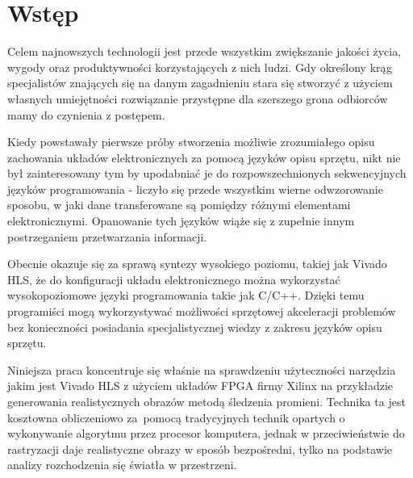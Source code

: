 
\chapter*{Wstęp}
{

\pagestyle{empty}
\pagestyle{fancy}
\fancyhead{} %
\fancyhead[RO,LE]{\thepage}

Celem najnowszych technologii jest przede wszystkim zwiększanie jakości życia, wygody oraz produktywności korzystających z nich ludzi. Gdy określony krąg specjalistów znających się na danym zagadnieniu stara się stworzyć z użyciem własnych umiejętności rozwiązanie przystępne dla szerszego grona odbiorców mamy do czynienia z postępem.

Kiedy powstawały pierwsze próby stworzenia możliwie zrozumiałego opisu zachowania układów elektronicznych za pomocą języków opisu sprzętu, nikt nie był zainteresowany tym by upodabniać je do rozpowszechnionych sekwencyjnych języków programowania - liczyło się przede wszystkim wierne odwzorowanie sposobu, w jaki dane transferowane są pomiędzy różnymi elementami elektronicznymi. Opanowanie tych języków wiąże się z zupełnie innym postrzeganiem przetwarzania informacji. 

Obecnie okazuje się za sprawą syntezy wysokiego poziomu, takiej jak Vivado HLS, że do konfiguracji układu elektronicznego można wykorzystać wysokopoziomowe języki programowania takie jak C/C++. Dzięki temu programiści mogą wykorzystywać możliwości sprzętowej akceleracji problemów bez konieczności posiadania specjalistycznej wiedzy z zakresu języków opisu sprzętu.

Niniejsza praca koncentruje się właśnie na sprawdzeniu użyteczności narzędzia jakim jest Vivado HLS z użyciem układów FPGA firmy Xilinx na przykładzie generowania realistycznych obrazów metodą śledzenia promieni. Technika ta jest kosztowna obliczeniowo za~pomocą tradycyjnych technik opartych o wykonywanie algorytmu przez procesor komputera, jednak w przeciwieństwie do rastryzacji daje realistyczne obrazy w sposób bezpośredni, tylko na podstawie analizy rozchodzenia się światła w przestrzeni.

}
